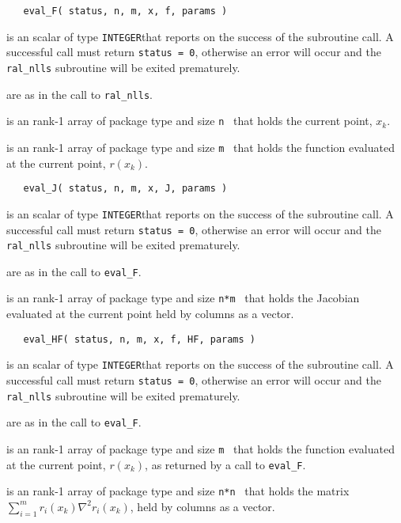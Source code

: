 \documentclass{hslspec}
\newcommand{\scalarintegerio}{is an \intentout scalar of type {\tt INTEGER}}
\newcommand{\ronearrayrealii}[1]{is an \intentin rank-1 array of package type and size {\tt #1}\ }
\newcommand{\ronearrayrealio}[1]{is an \intentout rank-1 array of package type and size {\tt #1}\ }
\begin{document}
\begin{verbatim}
   eval_F( status, n, m, x, f, params )
\end{verbatim}

\begin{description}
   \scalarintegerio that reports on the success of the subroutine call.  A successful call must return {\tt status = 0}, otherwise an error will occur and the {\tt ral\_nlls} subroutine will be exited prematurely.

   are as in the call to {\tt ral\_nlls}.

   \ronearrayrealii{n} that holds the current point, $x_k$.
  
   \ronearrayrealio{m} that holds the function evaluated at the current point, $r(x_k)$.
  
\end{description}

\begin{verbatim}
   eval_J( status, n, m, x, J, params )
\end{verbatim}

\begin{description}
   \scalarintegerio that reports on the success of the subroutine call.  A successful call must return {\tt status = 0}, otherwise an error will occur and the {\tt ral\_nlls} subroutine will be exited prematurely.

   are as in the call to {\tt eval\_F}.

  
   \ronearrayrealio{n*m} that holds the Jacobian evaluated at the current point held by columns as a vector.
  
\end{description}

\begin{verbatim}
   eval_HF( status, n, m, x, f, HF, params )
\end{verbatim}

\begin{description}
   \scalarintegerio that reports on the success of the subroutine call.  A successful call must return {\tt status = 0}, otherwise an error will occur and the {\tt ral\_nlls} subroutine will be exited prematurely.

   are as in the call to {\tt eval\_F}.

  
   \ronearrayrealii{m} that holds the function evaluated at the current point, $r(x_k)$, as returned by a call to {\tt eval\_F}.

   \ronearrayrealio{n*n} that holds the matrix $\sum_{i = 1}^m r_i(x_k)\nabla^2r_i(x_k)$, held by columns as a vector.
  
\end{description}
\end{document}
